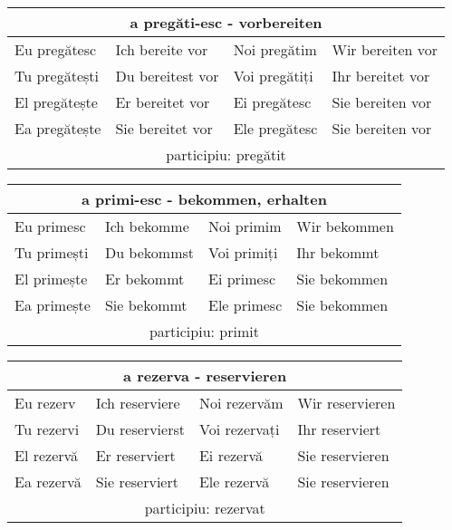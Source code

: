 \documentclass[11pt, oneside]{article}
\begin{document}
%
%
\begin{center}
  \begin{tabular}{ |p{3.25cm}|p{3.25cm}||p{3.25cm}|p{3.25cm}| }
      \hline
      \multicolumn{4}{|c|}{a pregăti-esc - vorbereiten} \\
      \hline
      \hline
      Eu pregătesc & Ich bereite vor & Noi pregătim & Wir bereiten vor\\
      \hline
      Tu pregătești & Du bereitest vor & Voi pregătiți & Ihr bereitet vor\\
      \hline
      El pregătește & Er bereitet vor  & Ei pregătesc & Sie bereiten vor\\ 
      Ea pregătește & Sie bereitet vor & Ele pregătesc & Sie bereiten vor\\
      \hline
      \multicolumn{4}{|c|}{participiu: pregătit} \\
      \hline
     \end{tabular}
\end{center}
%
%
\begin{center}
  \begin{tabular}{ |p{3.25cm}|p{3.25cm}||p{3.25cm}|p{3.25cm}| }
      \hline
      \multicolumn{4}{|c|}{a primi-esc - bekommen, erhalten} \\
      \hline
      \hline
      Eu primesc & Ich bekomme & Noi primim & Wir bekommen\\
      \hline
      Tu primești & Du bekommst & Voi primiți & Ihr bekommt\\
      \hline
      El primește & Er bekommt & Ei primesc & Sie bekommen\\ 
      Ea primește & Sie bekommt & Ele primesc & Sie bekommen\\
      \hline
      \multicolumn{4}{|c|}{participiu: primit} \\
      \hline
     \end{tabular}
\end{center}
%
\begin{center}
  \begin{tabular}{ |p{3.25cm}|p{3.25cm}||p{3.25cm}|p{3.25cm}| }
      \hline
      \multicolumn{4}{|c|}{a rezerva - reservieren} \\
      \hline
      \hline
      Eu rezerv & Ich reserviere & Noi rezervăm & Wir reservieren\\
      \hline
      Tu rezervi & Du reservierst & Voi rezervați & Ihr reserviert\\
      \hline
      El rezervă & Er reserviert & Ei rezervă & Sie reservieren\\ 
      Ea rezervă & Sie reserviert & Ele rezervă & Sie reservieren\\
      \hline
      \multicolumn{4}{|c|}{participiu: rezervat} \\
      \hline
     \end{tabular}
\end{center}
%
%
%
%
\end{document}
